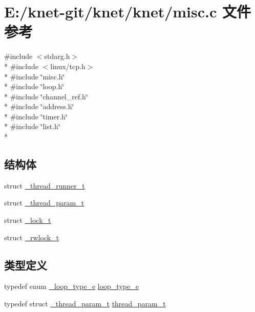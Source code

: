 \hypertarget{a00099}{}\section{E\+:/knet-\/git/knet/knet/misc.c 文件参考}
\label{a00099}
{\ttfamily \#include $<$stdarg.\+h$>$}\\*
{\ttfamily \#include $<$linux/tcp.\+h$>$}\\*
{\ttfamily \#include \char`\"{}misc.\+h\char`\"{}}\\*
{\ttfamily \#include \char`\"{}loop.\+h\char`\"{}}\\*
{\ttfamily \#include \char`\"{}channel\+\_\+ref.\+h\char`\"{}}\\*
{\ttfamily \#include \char`\"{}address.\+h\char`\"{}}\\*
{\ttfamily \#include \char`\"{}timer.\+h\char`\"{}}\\*
{\ttfamily \#include \char`\"{}list.\+h\char`\"{}}\\*
\subsection*{结构体}
\begin{DoxyCompactItemize}
\item 
struct \hyperlink{a00047}{\+\_\+thread\+\_\+runner\+\_\+t}
\item 
struct \hyperlink{a00046}{\+\_\+thread\+\_\+param\+\_\+t}
\item 
struct \hyperlink{a00027}{\+\_\+lock\+\_\+t}
\item 
struct \hyperlink{a00044}{\+\_\+rwlock\+\_\+t}
\end{DoxyCompactItemize}
\subsection*{类型定义}
\begin{DoxyCompactItemize}
\item 
typedef enum \hyperlink{a00099_a2583618f1d6afdd0085a96f59b45d9bd_a2583618f1d6afdd0085a96f59b45d9bd}{\+\_\+loop\+\_\+type\+\_\+e} \hyperlink{a00099_a93730d5de4a5f4dbe3013b02b051df62_a93730d5de4a5f4dbe3013b02b051df62}{loop\+\_\+type\+\_\+e}
\item 
typedef struct \hyperlink{a00046}{\+\_\+thread\+\_\+param\+\_\+t} \hyperlink{a00099_aaca514c4c0b391f40ccc7e8c68fd4c21_aaca514c4c0b391f40ccc7e8c68fd4c21}{thread\+\_\+param\+\_\+t}
\end{DoxyCompactItemize}
